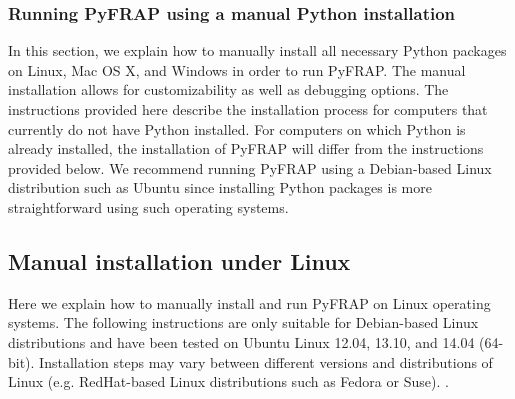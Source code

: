 \documentclass[a4paper,11pt]{article}
\begin{document}
\subsubsection{Running PyFRAP using a manual Python installation}
\label{sec:manually}
In this section, we explain how to manually install all necessary Python packages on Linux, Mac OS X, and Windows in order to run PyFRAP. The manual installation allows for customizability as well as debugging options. The instructions provided here describe the installation process for computers that currently do not have Python installed. For computers on which Python is already installed, the installation of PyFRAP will differ from the instructions provided below. We recommend running PyFRAP using a Debian-based Linux distribution such as Ubuntu since installing Python packages is more straightforward using such operating systems.

\subsection{Manual installation under Linux}

Here we explain how to manually install and run PyFRAP on Linux operating systems. The following instructions are only suitable for Debian-based Linux distributions and have been tested on Ubuntu Linux 12.04, 13.10, and 14.04 (64-bit). Installation steps may vary between different versions and distributions of Linux (e.g. RedHat-based Linux distributions such as Fedora or Suse). .
\end{document}
